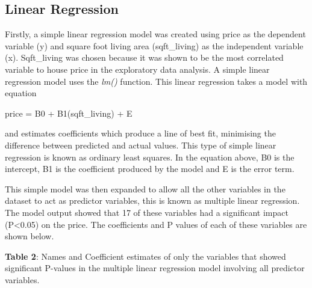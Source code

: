 \documentclass[
]{article}
\begin{document}
\hypertarget{linear-regression}{%
\subsection{Linear Regression}\label{linear-regression}}

Firstly, a simple linear regression model was created using price as the
dependent variable (y) and square foot living area (sqft\_living) as the
independent variable (x). Sqft\_living was chosen because it was shown
to be the most correlated variable to house price in the exploratory
data analysis. A simple linear regression model uses the \emph{lm()}
function. This linear regression takes a model with equation

price = B0 + B1(sqft\_living) + E

and estimates coefficients which produce a line of best fit, minimising
the difference between predicted and actual values. This type of simple
linear regression is known as ordinary least squares. In the equation
above, B0 is the intercept, B1 is the coefficient produced by the model
and E is the error term.

This simple model was then expanded to allow all the other variables in
the dataset to act as predictor variables, this is known as multiple
linear regression. The model output showed that 17 of these variables
had a significant impact (P\textless0.05) on the price. The coefficients
and P values of each of these variables are shown below.

\textbf{Table 2}: Names and Coefficient estimates of only the variables
that showed significant P-values in the multiple linear regression model
involving all predictor variables.
\end{document}
